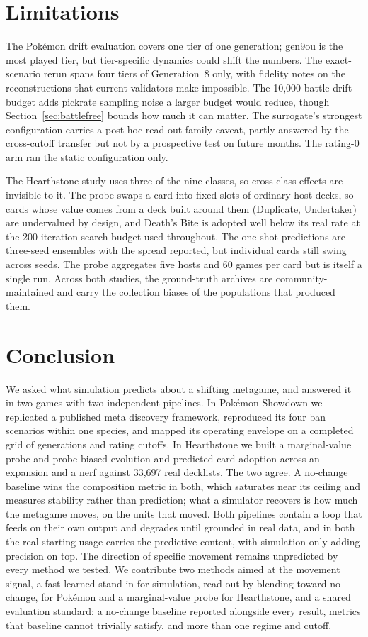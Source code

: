 \documentclass[journal]{IEEEtran}
\newcommand{\pkmn}{Pok\'emon}
\begin{document}
\section{Limitations}
\label{sec:limitations}

The \pkmn{} drift evaluation covers one tier of one generation; gen9ou is
the most played tier, but tier-specific dynamics could shift the numbers.
The exact-scenario rerun spans four tiers of Generation~8 only, with
fidelity notes on the reconstructions that current validators make
impossible. The 10{,}000-battle drift budget adds pickrate sampling noise
a larger budget would reduce, though Section~\ref{sec:battlefree} bounds
how much it can matter. The surrogate's strongest configuration carries a
post-hoc read-out-family caveat, partly answered by the cross-cutoff
transfer but not by a prospective test on future months. The rating-0 arm
ran the static configuration only.

The Hearthstone study uses three of the nine classes, so cross-class
effects are invisible to it. The probe swaps a card into fixed slots of
ordinary host decks, so cards whose value comes from a deck built around
them (Duplicate, Undertaker) are undervalued by design, and Death's Bite
is adopted well below its real rate at the 200-iteration search budget
used throughout. The one-shot predictions are three-seed ensembles with
the spread reported, but individual cards still swing across seeds. The
probe aggregates five hosts and 60 games per card but is itself a single
run. Across both studies, the ground-truth
archives are community-maintained and carry the collection biases of the
populations that produced them.

\section{Conclusion}

We asked what simulation predicts about a shifting metagame, and answered
it in two games with two independent pipelines. In \pkmn{} Showdown we
replicated a published meta discovery framework, reproduced its four ban
scenarios within one species, and mapped its operating envelope on a
completed grid of generations and rating cutoffs. In Hearthstone we
built a marginal-value probe and probe-biased evolution and predicted card
adoption across an expansion and a nerf against 33{,}697 real decklists.
The two agree. A no-change baseline wins the composition metric in both,
which saturates near its ceiling and measures stability rather than
prediction; what a simulator recovers is how much the metagame moves, on
the units that moved. Both pipelines contain a loop that feeds on their own output and degrades until grounded in real data, and in both the real starting usage carries the predictive content, with simulation only adding precision on top. The direction of specific movement remains unpredicted by every
method we tested. We contribute two methods aimed at the movement signal,
a fast learned stand-in for simulation, read out by blending toward no change, for \pkmn{} and a
marginal-value probe for Hearthstone, and a shared evaluation standard: a no-change baseline reported alongside every result, metrics that baseline cannot trivially satisfy, and more than one regime and cutoff.
\end{document}

